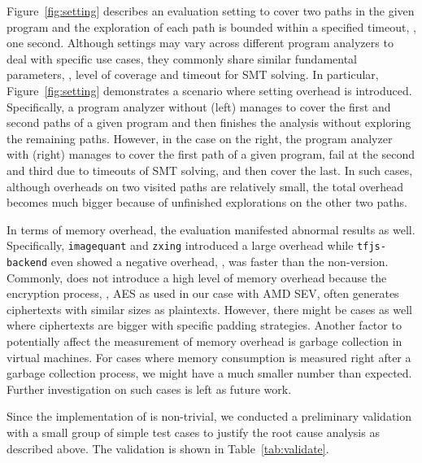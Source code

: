 Figure~\ref{fig:setting} describes an evaluation setting to cover two paths in the given program and the exploration 
of each path is bounded within a specified timeout, \eg, one second. Although settings may vary across different 
program analyzers to deal with specific use cases, they commonly share similar fundamental parameters, \eg, level of 
coverage and timeout for SMT solving. In particular, Figure~\ref{fig:setting} demonstrates a scenario where setting 
overhead is introduced. Specifically, a program analyzer without \tee (left) manages to cover the first and second 
paths of a given program and then finishes the analysis without exploring the remaining paths. However, in the case 
on the right, the program analyzer with \tee (right) manages to cover the first path of a given program, fail at 
the second and third due to timeouts of SMT solving, and then cover the last. In such cases, although overheads 
on two visited paths are relatively small, the total overhead becomes much bigger because of unfinished explorations 
on the other two paths.



In terms of memory overhead, the evaluation manifested abnormal results as well. Specifically, \texttt{imagequant} 
and \texttt{zxing} introduced a large overhead while \texttt{tfjs-backend} even showed a negative overhead, \ie, 
\tool was faster than the non-\tee version. Commonly, \tcpa does not introduce a high level of memory overhead because 
the encryption process, \eg, AES as used in our case with AMD SEV, often generates ciphertexts with similar sizes as 
plaintexts. However, there might be cases as well where ciphertexts are bigger with specific padding strategies. Another 
factor to potentially affect the measurement of memory overhead is garbage collection in virtual machines. For cases where 
memory consumption is measured right after a garbage collection process, we might have a much smaller number than expected. 
Further investigation on such cases is left as future work.

Since the implementation of \tool is non-trivial, we conducted a preliminary validation with a small group of 
simple test cases to justify the root cause analysis as described above. The validation is shown in Table~\ref{tab:validate}.




